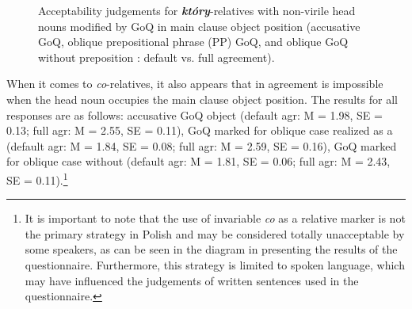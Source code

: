 \documentclass[output=paper]{langsci/langscibook}
\begin{document}
\begin{figure}
\caption{Acceptability judgements for \textbf{\textit{który}}{}-relatives with non-virile head nouns modified by GoQ in main clause object position (accusative GoQ, oblique prepositional phrase (PP) GoQ, and oblique GoQ without preposition : default vs. full agreement).}
\label{fig:leska:1}
\end{figure}

When it comes to \textit{co}{}-relatives, it also appears that  in agreement is impossible when the head noun occupies the main clause object position. The results for all responses are as follows: accusative GoQ object (default agr: M = 1.98, SE = 0.13; full agr: M = 2.55, SE = 0.11), GoQ marked for oblique case realized as a  (default agr: M = 1.84, SE = 0.08; full agr: M = 2.59, SE = 0.16), GoQ marked for oblique case without  (default agr: M = 1.81, SE = 0.06; full agr: M = 2.43, SE = 0.11).\footnote{It is important to note that the use of invariable \textit{co} as a relative marker is not the primary  strategy in Polish and may be considered totally unacceptable by some speakers, as can be seen in the diagram in  presenting the results of the questionnaire. Furthermore, this strategy is limited to spoken language, which may have influenced the judgements of written sentences used in the questionnaire.} 
\end{document}
